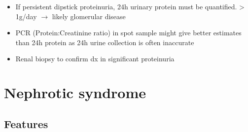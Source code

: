 \documentclass[
  12pt,
]{memoir}
\providecommand{\tightlist}{%
  \setlength{\itemsep}{0pt}\setlength{\parskip}{0pt}}
\begin{document}
\begin{itemize}
\begin{itemize}
    \begin{itemize}
    \tightlist
    \item
      If persistent dipstick proteinuria, 24h urinary protein must be
      quantified. \textgreater{} 1g/day \(\rightarrow\) likely
      glomerular disease
    \item
      PCR (Protein:Creatinine ratio) in spot sample might give better
      estimates than 24h protein as 24h urine collection is often
      inaccurate
    \item
      Renal biopsy to confirm dx in significant proteinuria
    \end{itemize}
  \end{itemize}
\end{itemize}

\hypertarget{nephrotic-syndrome}{%
\section{Nephrotic syndrome}\label{nephrotic-syndrome}}

\hypertarget{features-2}{%
\subsection{Features}\label{features-2}}
\end{document}
